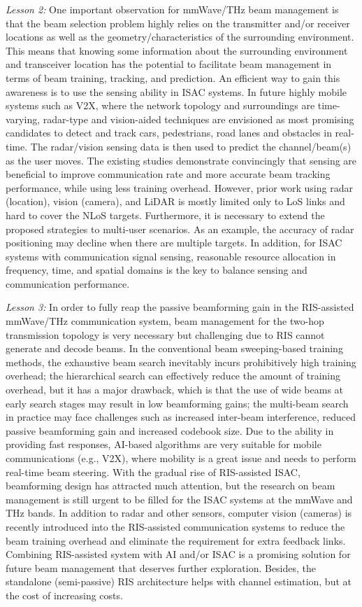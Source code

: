 \documentclass[journal,comsoc]{IEEEtran}
\begin{document}
\emph{Lesson 2:} One important observation for mmWave/THz beam management is that the beam selection problem highly relies on the transmitter and/or receiver locations as well as the geometry/characteristics of the surrounding environment. This means that knowing some information about the surrounding environment and transceiver location has the potential to facilitate beam management in terms of beam training, tracking, and prediction. An efficient way to gain this awareness is to use the sensing ability in ISAC systems. In future highly mobile systems such as V2X, where the network topology and surroundings are time-varying, radar-type and vision-aided techniques are envisioned as most promising candidates to detect and track cars, pedestrians, road lanes and obstacles in real-time. The radar/vision sensing data is then used to predict the channel/beam(s) as the user moves. The existing studies demonstrate convincingly that sensing are beneficial to improve communication rate and more accurate beam tracking performance, while using less training overhead. However, prior work using radar (location), vision (camera), and LiDAR is mostly limited only to LoS links and hard to cover the NLoS targets. Furthermore, it is necessary to extend the proposed strategies to multi-user scenarios. As an example, the accuracy of radar positioning may decline when there are multiple targets. In addition, for ISAC systems with communication signal sensing, reasonable resource allocation in frequency, time, and spatial domains is the key to balance sensing and communication performance.



\emph{Lesson 3:} In order to fully reap the passive beamforming gain in the RIS-assisted mmWave/THz communication system, beam management for the two-hop transmission topology is very necessary but challenging due to RIS cannot generate and decode beams. In the conventional beam sweeping-based training methods, the exhaustive beam search inevitably incurs prohibitively high training overhead; the hierarchical search can effectively reduce the amount of training overhead, but it has a major drawback, which is that the use of wide beams at early search stages may result in low beamforming gains; the multi-beam search in practice may face challenges such as increased inter-beam interference, reduced passive beamforming gain and increased codebook size. Due to the ability in providing fast responses, AI-based algorithms are very suitable for mobile communications (e.g., V2X), where mobility is a great issue and needs to perform real-time beam steering. With the gradual rise of RIS-assisted ISAC, beamforming design has attracted much attention, but the research on beam management is still urgent to be filled for the ISAC systems at the mmWave and THz bands. In addition to radar and other sensors, computer vision (cameras) is recently introduced into the RIS-assisted communication systems to reduce the beam training overhead and eliminate the requirement for extra feedback links. Combining RIS-assisted system with AI and/or ISAC is a promising solution for future beam management that deserves further exploration. Besides, the standalone (semi-passive) RIS architecture helps with channel estimation, but at the cost of increasing costs.
\end{document}
